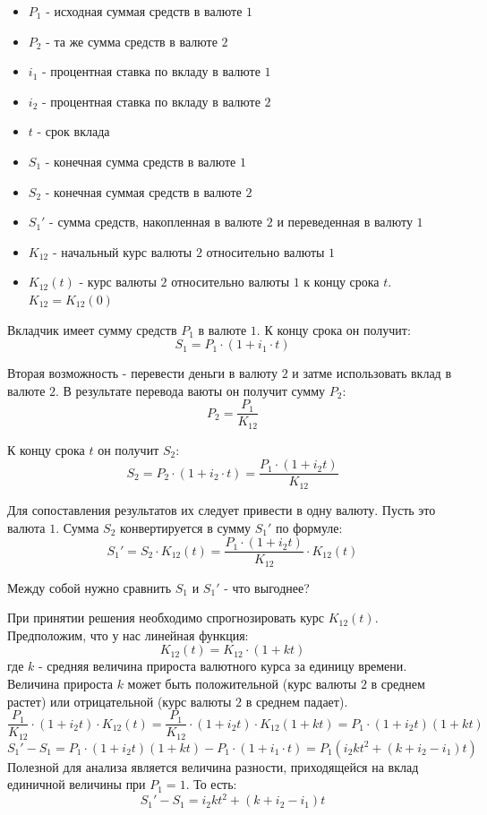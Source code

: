 \documentclass[aps,%
12pt,%
final,%
oneside,
onecolumn,%
musixtex, %
superscriptaddress,%
centertags]{article} %
\theoremstyle{plain}
\theoremstyle{definition}
\theoremstyle{remark}
\begin{document}
\begin{itemize}
	\item $P_1$ - исходная суммая средств в валюте $1$
	\item $P_2$ - та же сумма средств в валюте $2$
	\item $i_1$ - процентная ставка по вкладу в валюте $1$
	\item $i_2$ - процентная ставка по вкладу в валюте $2$
	\item $t$ - срок вклада
	\item $S_1$ - конечная сумма средств в валюте $1$
	\item $S_2$ - конечная суммая средств в валюте $2$
	\item $S_1'$ - сумма средств, накопленная в валюте $2$ и переведенная в валюту $1$
	\item $K_{12}$ - начальный курс валюты $2$ относительно валюты $1$
	\item $K_{12}(t)$ - курс валюты $2$ относительно валюты $1$ к концу срока $t$. $K_{12} = K_{12}(0)$
\end{itemize}

Вкладчик имеет сумму средств $P_1$ в валюте $1$. К концу срока он получит:
$$S_1 = P_1 \cdot (1+i_1 \cdot t)$$

Вторая возможность - перевести деньги в валюту $2$ и затме использовать вклад в валюте $2$. В результате перевода ваюты он получит сумму $P_2$:
$$P_2 = \frac{P_1}{K_{12}}$$

К концу срока $t$ он получит $S_2$:
$$S_2 =  P_2 \cdot (1+i_2 \cdot t) = \frac{P_1 \cdot (1+i_2 t)}{K_{12}}$$

Для сопоставления результатов их следует привести в одну валюту. Пусть это валюта $1$. Сумма $S_2$ конвертируется в сумму $S_1'$ по формуле:
$$S_1' = S_2 \cdot K_{12}(t) = \frac{P_1 \cdot (1+i_2 t)}{K_{12}} \cdot K_{12}(t) $$

Между собой нужно сравнить $S_1$ и $S_1'$ - что выгоднее?

При принятии решения необходимо спрогнозировать курс $K_{12}(t)$. Предположим, что у нас линейная функция:
$$K_{12}(t) = K_{12} \cdot (1 + kt)$$
где $k$ - средняя величина прироста валютного курса за единицу времени. Величина прироста $k$ может быть положительной (курс валюты $2$ в среднем растет) или отрицательной (курс валюты $2$ в среднем падает).
$$\frac{P_1}{K_{12}} \cdot (1 + i_2 t) \cdot K_{12}(t) = \frac{P_1}{K_{12}} \cdot (1 + i_2 t) \cdot K_{12} (1 + kt) = P_1 \cdot (1 + i_2 t) (1 + kt)$$
$$S_1' - S_1 = P_1 \cdot (1 + i_2 t) (1 + kt) - P_1 \cdot (1+i_1 \cdot t) = P_1(i_2kt^2 + (k+i_2-i_1)t)$$
Полезной для анализа является величина разности, приходящейся на вклад единичной величины при $P_1=1$. То есть:
$$S_1' - S_1 = i_2kt^2 + (k+i_2-i_1)t$$
\end{document}
